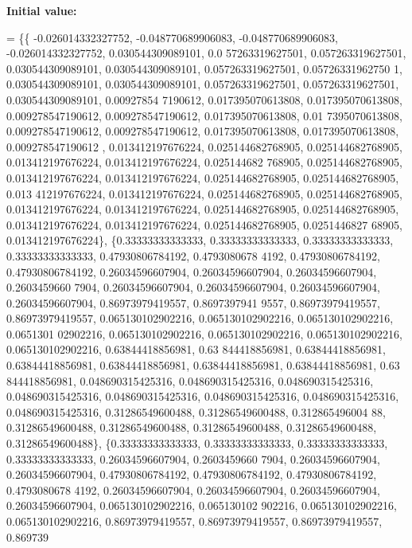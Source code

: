 {\bfseries Initial value\+:}
\begin{DoxyCode}
= \{\{ -0.026014332327752, -0.048770689906083, -0.048770689906083, -0.026014332327752, 0.030544309089101, 0.0
      57263319627501, 0.057263319627501, 0.030544309089101, 0.030544309089101, 0.057263319627501, 0.05726331962750
      1, 0.030544309089101, 0.030544309089101, 0.057263319627501, 0.057263319627501, 0.030544309089101, 0.00927854
      7190612, 0.017395070613808, 0.017395070613808, 0.009278547190612, 0.009278547190612, 0.017395070613808, 0.01
      7395070613808, 0.009278547190612, 0.009278547190612, 0.017395070613808, 0.017395070613808, 0.009278547190612
      , 0.013412197676224, 0.025144682768905, 0.025144682768905, 0.013412197676224, 0.013412197676224, 0.025144682
      768905, 0.025144682768905, 0.013412197676224, 0.013412197676224, 0.025144682768905, 0.025144682768905, 0.013
      412197676224, 0.013412197676224, 0.025144682768905, 0.025144682768905, 0.013412197676224, 0.013412197676224,
       0.025144682768905, 0.025144682768905, 0.013412197676224, 0.013412197676224, 0.025144682768905, 0.0251446827
      68905, 0.013412197676224\},
    \{0.33333333333333, 0.33333333333333, 0.33333333333333, 0.33333333333333, 0.47930806784192, 0.4793080678
      4192, 0.47930806784192, 0.47930806784192, 0.26034596607904, 0.26034596607904, 0.26034596607904, 0.2603459660
      7904, 0.26034596607904, 0.26034596607904, 0.26034596607904, 0.26034596607904, 0.86973979419557, 0.8697397941
      9557, 0.86973979419557, 0.86973979419557, 0.065130102902216, 0.065130102902216, 0.065130102902216, 0.0651301
      02902216, 0.065130102902216, 0.065130102902216, 0.065130102902216, 0.065130102902216, 0.63844418856981, 0.63
      844418856981, 0.63844418856981, 0.63844418856981, 0.63844418856981, 0.63844418856981, 0.63844418856981, 0.63
      844418856981, 0.048690315425316, 0.048690315425316, 0.048690315425316, 0.048690315425316, 0.048690315425316,
       0.048690315425316, 0.048690315425316, 0.048690315425316, 0.31286549600488, 0.31286549600488, 0.312865496004
      88, 0.31286549600488, 0.31286549600488, 0.31286549600488, 0.31286549600488, 0.31286549600488\},
    \{0.33333333333333, 0.33333333333333, 0.33333333333333, 0.33333333333333, 0.26034596607904, 0.2603459660
      7904, 0.26034596607904, 0.26034596607904, 0.47930806784192, 0.47930806784192, 0.47930806784192, 0.4793080678
      4192, 0.26034596607904, 0.26034596607904, 0.26034596607904, 0.26034596607904, 0.065130102902216, 0.065130102
      902216, 0.065130102902216, 0.065130102902216, 0.86973979419557, 0.86973979419557, 0.86973979419557, 0.869739

\end{DoxyCode}
